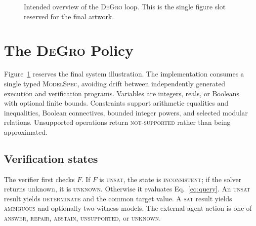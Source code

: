 \documentclass[sigconf,anonymous]{aamas}
\newcommand{\method}{\textsc{DeGro}}
\newcommand{\sat}{\textsc{sat}}
\newcommand{\unsat}{\textsc{unsat}}
\begin{document}
\begin{figure}[t]
\centering
{}
\caption{Intended overview of the \method{} loop.  This is the single figure slot reserved for the final artwork.}
\label{fig:overview}
\end{figure}

\section{The \method{} Policy}
Figure~\ref{fig:overview} reserves the final system illustration.  The implementation consumes a single typed \textsc{ModelSpec}, avoiding drift between independently generated execution and verification programs.  Variables are integers, reals, or Booleans with optional finite bounds.  Constraints support arithmetic equalities and inequalities, Boolean connectives, bounded integer powers, and selected modular relations.  Unsupported operations return \textsc{not-supported} rather than being approximated.

\subsection{Verification states}
The verifier first checks $F$.  If $F$ is \unsat, the state is \textsc{inconsistent}; if the solver returns unknown, it is \textsc{unknown}.  Otherwise it evaluates Eq.~\eqref{eq:query}.  An \unsat{} result yields \textsc{determinate} and the common target value.  A \sat{} result yields \textsc{ambiguous} and optionally two witness models.  The external agent action is one of \textsc{answer}, \textsc{repair}, \textsc{abstain}, \textsc{unsupported}, or \textsc{unknown}.
\end{document}
